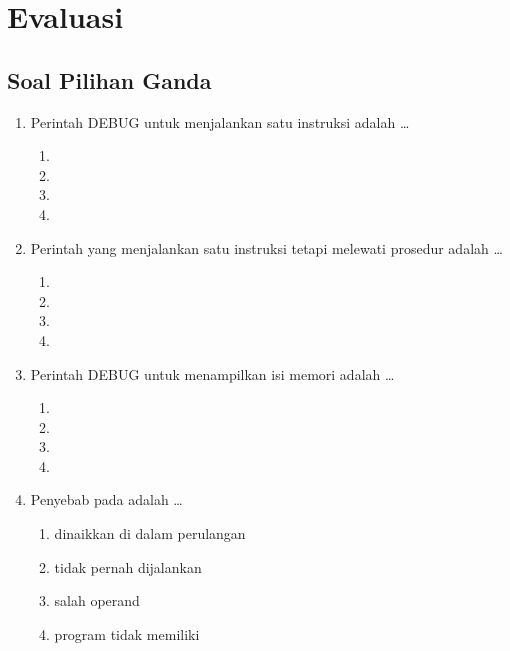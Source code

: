 \section{Evaluasi}
\label{sec:evaluasi-bab16}

\subsection{Soal Pilihan Ganda}

\begin{enumerate}
    \item Perintah DEBUG untuk menjalankan satu instruksi adalah
          \dots
          \begin{enumerate}
              \item {} \item {}
              \item {} \item {}
          \end{enumerate}

    \item Perintah yang menjalankan satu instruksi tetapi melewati
          prosedur adalah \dots
          \begin{enumerate}
              \item {} \item {}
              \item {} \item {}
          \end{enumerate}

    \item Perintah DEBUG untuk menampilkan isi memori adalah \dots
          \begin{enumerate}
              \item {} \item {}
              \item {} \item {}
          \end{enumerate}

    \item Penyebab  pada  adalah \dots
          \begin{enumerate}
              \item {} dinaikkan di dalam perulangan
              \item {} tidak pernah dijalankan
              \item {} salah operand
              \item program tidak memiliki 
          \end{enumerate}


\end{enumerate}
